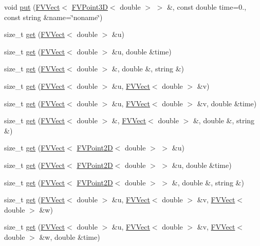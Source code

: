 \begin{DoxyCompactItemize}
\item 
void \hyperlink{classFVio_a60aad07de3ad49fe4c05e2a59ee4e64f}{put} (\hyperlink{classFVVect}{FVVect}$<$ \hyperlink{classFVPoint3D}{FVPoint3D}$<$ double $>$ $>$ \&, const double time=0., const string \&name=\char`\"{}noname\char`\"{})
\item 
size\_\-t \hyperlink{classFVio_a5191ef01cb57c47fab251c8522722e9c}{get} (\hyperlink{classFVVect}{FVVect}$<$ double $>$ \&u)
\item 
size\_\-t \hyperlink{classFVio_a1ffaebb7a226b10a5eda100d90de6c10}{get} (\hyperlink{classFVVect}{FVVect}$<$ double $>$ \&u, double \&time)
\item 
size\_\-t \hyperlink{classFVio_a5ea6770f0f9a764f9e45bd7926b94169}{get} (\hyperlink{classFVVect}{FVVect}$<$ double $>$ \&, double \&, string \&)
\item 
size\_\-t \hyperlink{classFVio_afb6c8ab6a4216b01056b53012c152acc}{get} (\hyperlink{classFVVect}{FVVect}$<$ double $>$ \&u, \hyperlink{classFVVect}{FVVect}$<$ double $>$ \&v)
\item 
size\_\-t \hyperlink{classFVio_a9002feadcd4d5ce3900a5f972284d8c8}{get} (\hyperlink{classFVVect}{FVVect}$<$ double $>$ \&u, \hyperlink{classFVVect}{FVVect}$<$ double $>$ \&v, double \&time)
\item 
size\_\-t \hyperlink{classFVio_a20150469af5dec61b33ff521916e11f7}{get} (\hyperlink{classFVVect}{FVVect}$<$ double $>$ \&, \hyperlink{classFVVect}{FVVect}$<$ double $>$ \&, double \&, string \&)
\item 
size\_\-t \hyperlink{classFVio_afb116b2ec6808a030f711d9d7af18534}{get} (\hyperlink{classFVVect}{FVVect}$<$ \hyperlink{classFVPoint2D}{FVPoint2D}$<$ double $>$ $>$ \&u)
\item 
size\_\-t \hyperlink{classFVio_aae1711390a6217e8bf7357c413723584}{get} (\hyperlink{classFVVect}{FVVect}$<$ \hyperlink{classFVPoint2D}{FVPoint2D}$<$ double $>$ $>$ \&u, double \&time)
\item 
size\_\-t \hyperlink{classFVio_af562bf51c66221c9c8899319d682e148}{get} (\hyperlink{classFVVect}{FVVect}$<$ \hyperlink{classFVPoint2D}{FVPoint2D}$<$ double $>$ $>$ \&, double \&, string \&)
\item 
size\_\-t \hyperlink{classFVio_a015e3aa19b1fe1a19bf5fb3c24d1e33e}{get} (\hyperlink{classFVVect}{FVVect}$<$ double $>$ \&u, \hyperlink{classFVVect}{FVVect}$<$ double $>$ \&v, \hyperlink{classFVVect}{FVVect}$<$ double $>$ \&w)
\item 
size\_\-t \hyperlink{classFVio_ae5f9d2dc9547ce8f4a7f574e0312299c}{get} (\hyperlink{classFVVect}{FVVect}$<$ double $>$ \&u, \hyperlink{classFVVect}{FVVect}$<$ double $>$ \&v, \hyperlink{classFVVect}{FVVect}$<$ double $>$ \&w, double \&time)

\end{DoxyCompactItemize}
